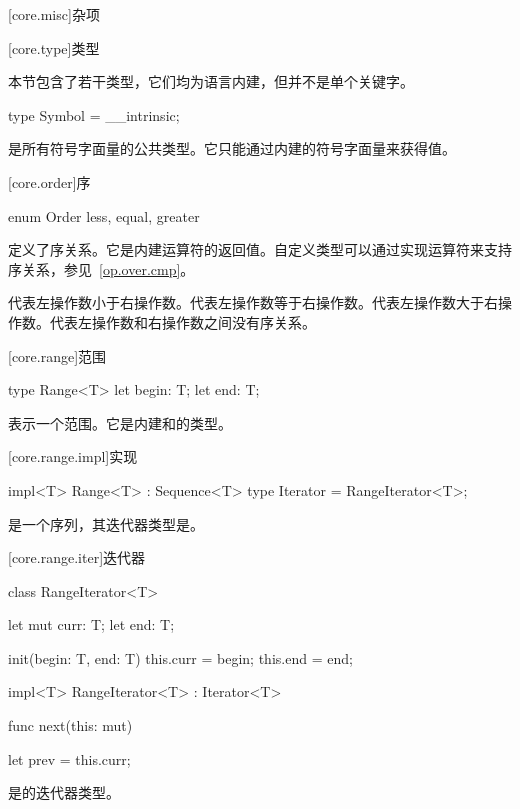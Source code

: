
[core.misc]{杂项}

[core.type]{类型}

\pnum
本节包含了若干类型，它们均为语言内建，但并不是单个关键字。

\begin{itemdecl}
type Symbol = __intrinsic;
\end{itemdecl}

\pnum
{}是所有符号字面量的公共类型。它只能通过内建的符号字面量来获得值。

[core.order]{序}

\begin{itemdecl}
enum Order {
    less,
    equal,
    greater
}
\end{itemdecl}

\pnum
{}定义了序关系。它是内建运算符的返回值。自定义类型可以通过实现运算符来支持序关系，参见~\ref{op.over.cmp}。

\pnum
{}代表左操作数小于右操作数。代表左操作数等于右操作数。代表左操作数大于右操作数。代表左操作数和右操作数之间没有序关系。

[core.range]{范围}

\begin{itemdecl}
type Range<T> {
    let begin: T;
    let end: T;
}
\end{itemdecl}

\pnum
{}表示一个范围。它是内建和的类型。

[core.range.impl]{实现}

\begin{itemdecl}
impl<T> Range<T> : Sequence<T> {
    type Iterator = RangeIterator<T>;
}
\end{itemdecl}

\pnum
{}是一个序列，其迭代器类型是。

[core.range.iter]{迭代器}

\begin{itemdecl}
class RangeIterator<T> {
    let mut curr: T;
    let end: T;

    init(begin: T, end: T) {
        this.curr = begin;
        this.end = end;
    }
}

impl<T> RangeIterator<T> : Iterator<T> {
    func next(this: mut) {


        let prev = this.curr;
    }
}
\end{itemdecl}

\pnum
{}是的迭代器类型。